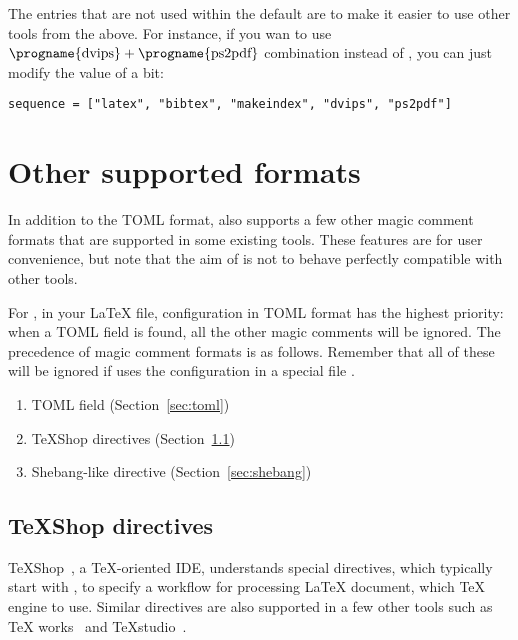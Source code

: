 \documentclass{llmk-doc}
\begin{document}
The entries that are not used within the default  are to make it
easier to use other tools from the above. For instance, if you wan to use
$\text{\progname{dvips}}+\text{\progname{ps2pdf}}$ combination instead of
, you can just modify the value of  a bit:
%
\begin{lstlisting}[style=toml]
sequence = ["latex", "bibtex", "makeindex", "dvips", "ps2pdf"]
\end{lstlisting}

\section{Other supported formats}
\label{sec:magic-comment}

In addition to the TOML format,  also supports a few other magic
comment formats that are supported in some existing tools. These features are
for user convenience, but note that the aim of  is not to behave
perfectly compatible with other tools.

For , in your {\LaTeX} file, configuration in TOML format has the
highest priority: when a TOML field is found, all the other magic comments will
be ignored. The precedence of magic comment formats is as follows. Remember
that all of these will be ignored if  uses the configuration in a
special file .
%
\begin{enumerate}
\item TOML field (Section~\ref{sec:toml})
\item {\TeX}Shop directives (Section~\ref{sec:ts-directive})
\item Shebang-like directive (Section~\ref{sec:shebang})
\end{enumerate}

\subsection{{\TeX}Shop directives}
\label{sec:ts-directive}

{\TeX}Shop~\cite{texshop}, a {\TeX}-oriented IDE, understands special
directives, which typically start with , to
specify a workflow for processing {\LaTeX} document, \eg which {\TeX} engine to
use. Similar directives are also supported in a few other tools such as {\TeX}%
works~\cite{texworks} and {\TeX}studio~\cite{texstudio}.
\end{document}
